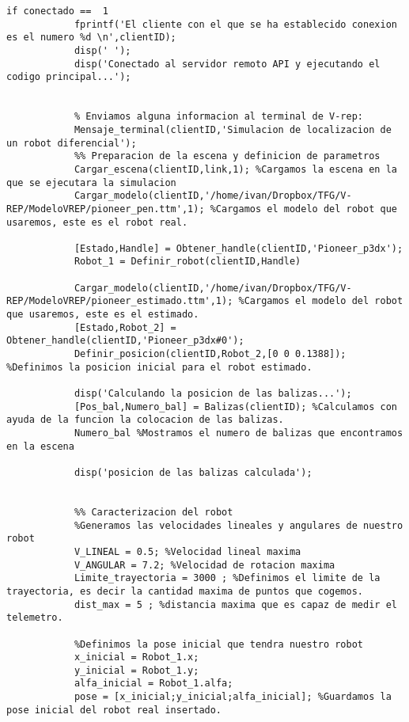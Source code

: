 \begin{lstlisting}[frame=single]
        if conectado ==  1
            fprintf('El cliente con el que se ha establecido conexion es el numero %d \n',clientID);
            disp(' ');
            disp('Conectado al servidor remoto API y ejecutando el codigo principal...');
            	

            % Enviamos alguna informacion al terminal de V-rep:
            Mensaje_terminal(clientID,'Simulacion de localizacion de un robot diferencial');
            %% Preparacion de la escena y definicion de parametros
            Cargar_escena(clientID,link,1); %Cargamos la escena en la que se ejecutara la simulacion
            Cargar_modelo(clientID,'/home/ivan/Dropbox/TFG/V-REP/ModeloVREP/pioneer_pen.ttm',1); %Cargamos el modelo del robot que usaremos, este es el robot real.
            
            [Estado,Handle] = Obtener_handle(clientID,'Pioneer_p3dx');
            Robot_1 = Definir_robot(clientID,Handle)
            
            Cargar_modelo(clientID,'/home/ivan/Dropbox/TFG/V-REP/ModeloVREP/pioneer_estimado.ttm',1); %Cargamos el modelo del robot que usaremos, este es el estimado.
            [Estado,Robot_2] = Obtener_handle(clientID,'Pioneer_p3dx#0');
            Definir_posicion(clientID,Robot_2,[0 0 0.1388]); %Definimos la posicion inicial para el robot estimado.
            
            disp('Calculando la posicion de las balizas...');
            [Pos_bal,Numero_bal] = Balizas(clientID); %Calculamos con ayuda de la funcion la colocacion de las balizas.
            Numero_bal %Mostramos el numero de balizas que encontramos en la escena 
            
            disp('posicion de las balizas calculada');
            

            %% Caracterizacion del robot
            %Generamos las velocidades lineales y angulares de nuestro robot
            V_LINEAL = 0.5; %Velocidad lineal maxima
            V_ANGULAR = 7.2; %Velocidad de rotacion maxima
            Limite_trayectoria = 3000 ; %Definimos el limite de la trayectoria, es decir la cantidad maxima de puntos que cogemos.
            dist_max = 5 ; %distancia maxima que es capaz de medir el telemetro.

            %Definimos la pose inicial que tendra nuestro robot
            x_inicial = Robot_1.x;
            y_inicial = Robot_1.y;
            alfa_inicial = Robot_1.alfa;
            pose = [x_inicial;y_inicial;alfa_inicial]; %Guardamos la pose inicial del robot real insertado.



\end{lstlisting}
